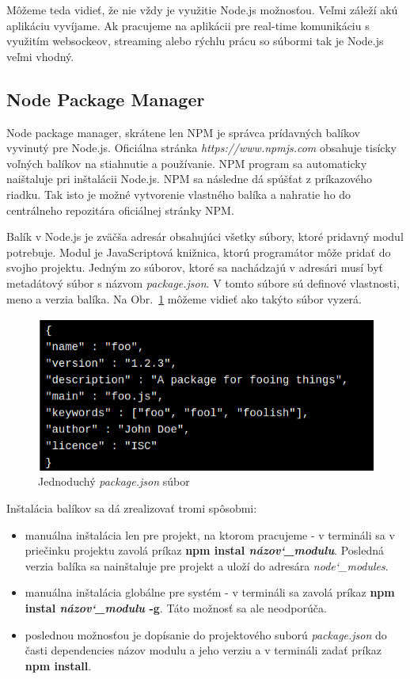 \indent Môžeme teda vidieť, že nie vždy je využitie Node.js možnosťou. Veľmi záleží akú aplikáciu vyvíjame. Ak pracujeme na aplikácii pre real-time komunikáciu s využitím websockeov, streaming alebo rýchlu prácu so súbormi tak je Node.js veľmi vhodný. 

\subsection{Node Package Manager}
\indent Node package manager, skrátene len NPM je správca prídavných balíkov vyvinutý pre Node.js. Oficiálna stránka \textit{https://www.npmjs.com} obsahuje tisícky voľných balíkov na stiahnutie a používanie. NPM program sa automaticky naištaluje pri inštalácii Node.js. NPM sa následne dá spúšťat z príkazového riadku. Tak isto je možné vytvorenie vlastného balíka a nahratie ho do centrálneho repozitára oficiálnej stránky NPM.

\indent Balík v Node.js je zväčša adresár obsahujúci všetky súbory, ktoré pridavný modul potrebuje. Modul je JavaScriptová knižnica, ktorú programátor môže pridať do svojho projektu. Jedným zo súborov, ktoré sa nachádzajú v adresári musí byť metadátový súbor s názvom \textit{package.json}. V tomto súbore sú definové vlastnosti, meno a verzia balíka. Na Obr.~\ref{fig:package} môžeme vidieť ako takýto súbor vyzerá.  

\begin{figure}[H]
    \centering
    \includegraphics[scale=0.55]{img/package.png}
    \caption{Jednoduchý \textit{package.json} súbor}
    \label{fig:package}
\end{figure}

Inštalácia balíkov sa dá zrealizovať tromi spôsobmi:
\begin{itemize}
    \item manuálna inštalácia len pre projekt, na ktorom pracujeme - v termináli sa v priečinku projektu zavolá príkaz \textbf{npm instal \textit{názov\char`_modulu}}. Posledná verzia balíka sa nainštaluje pre projekt a uloží do adresára \textit{node\char`_modules}.
    \item manuálna inštalácia globálne pre systém - v termináli sa zavolá príkaz \textbf{npm instal \textit{názov\char`_modulu} -g}. Táto možnosť sa ale neodporúča.
    \item poslednou možnosťou je dopísanie do projektového suború \textit{package.json} do časti dependencies názov modulu a jeho verziu a v termináli zadať príkaz \textbf{npm install}.
\end{itemize}

